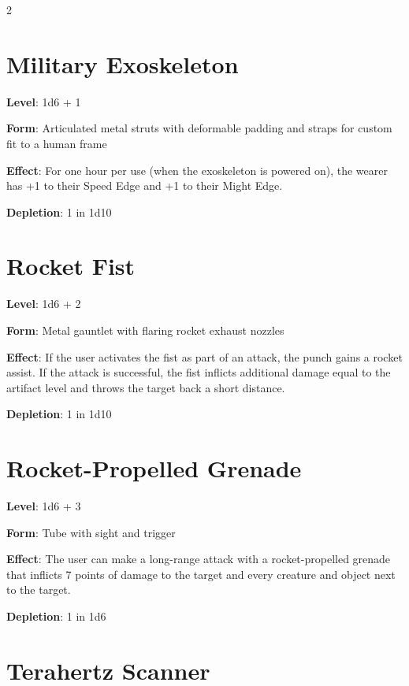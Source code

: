 \begin{multicols}{2}
\section{Military Exoskeleton}

\textbf{Level}: 1d6 + 1

\textbf{Form}: Articulated metal struts with deformable padding and straps for custom fit to a human frame

\textbf{Effect}: For one hour per use (when the exoskeleton is powered on), the wearer has +1 to their Speed Edge and +1 to their Might Edge.

\textbf{Depletion}: 1 in 1d10

\section{Rocket Fist}

\textbf{Level}: 1d6 + 2

\textbf{Form}: Metal gauntlet with flaring rocket exhaust nozzles 

\textbf{Effect}: If the user activates the fist as part of an attack, the punch gains a rocket assist. If the attack is successful, the fist inflicts additional damage equal to the artifact level and throws the target back a short distance.

\textbf{Depletion}: 1 in 1d10

\section{Rocket-Propelled Grenade}

\textbf{Level}: 1d6 + 3

\textbf{Form}: Tube with sight and trigger

\textbf{Effect}: The user can make a long-range attack with a rocket-propelled grenade that inflicts 7 points of damage to the target and every creature and object next to the target.

\textbf{Depletion}: 1 in 1d6

\section{Terahertz Scanner}


\end{multicols}
